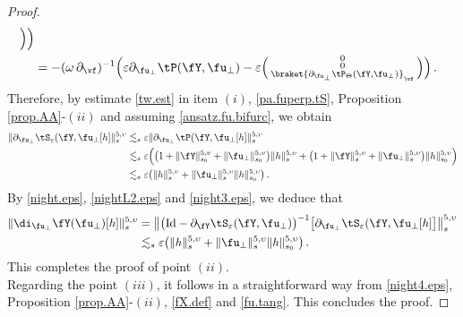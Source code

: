 \documentclass[a4paper,reqno,10pt]{article}
\newcommand{\pa}{\partial}
\begin{document}
\begin{proof}
\begin{align}
\begin{smallmatrix}
   	\end{smallmatrix}\Big) \Big) \\
   	&  =  - (\omega\,\pa_{\vf})^{-1} \Big( \varepsilon \pa_{\fu_{\perp}}\tP(\fY,\fu_{\perp}) -\varepsilon \Big(\begin{smallmatrix}
   		0  \\ 0 \\ \braket{ \pa_{\fu_{\perp}} \tP_{\Theta}(\fY,\fu_{\perp}) }_{\vf}
   	\end{smallmatrix}\Big) \Big)  \,. \label{pa.fuperp.tS}
   \end{align}
   Therefore, by estimate \eqref{tw.est} in item $(i)$, \eqref{pa.fuperp.tS}, Proposition \ref{prop.AA}-$(ii)$ and assuming \eqref{ansatz.fu.bifurc}, we obtain 
   \begin{align}
   	\|  	\pa_{\fu_{\perp}} \tS_{\varepsilon}(\fY,\fu_{\perp}[h]\|_{s}^{5,\upsilon} & \lesssim_{s} \varepsilon \| 	\pa_{\fu_{\perp}} \tP(\fY,\fu_{\perp}[h] \|_{s}^{5,\upsilon} \\
   	& \lesssim_{s} \varepsilon \Big( \big( 1+\| \fY\|_{s_0}^{5,\upsilon} + \| \fu_{\perp}\|_{s_0}^{5,\upsilon} \big) \| h \|_{s}^{5,\upsilon}+  \big( 1+ \| \fY\|_{s}^{5,\upsilon} + \| \fu_{\perp}\|_{s}^{5,\upsilon} \big) \| h \|_{s_0}^{5,\upsilon} \Big) \\
   	& \lesssim_{s}  \varepsilon\big(  \| h\|_{s}^{5,\upsilon}  +  \| \fu_{\perp}\|_{s}^{5,\upsilon}   \| h\|_{s_0}^{5,\upsilon}  \big) \,.\label{night3.eps} 
   \end{align}
   By \eqref{night.eps}, \eqref{nightL2.eps} and \eqref{night3.eps}, we deduce that
   \begin{align}
   	\| \di_{\fu_{\perp}} \fY(\fu_{\perp}) [h] \|_{s}^{5,\upsilon} & = \big\|  \big( {\rm Id} -\pa_{\fY} \tS_{\varepsilon}(\fY,\fu_{\perp})\big)^{-1} \big[  	\pa_{\fu_{\perp}} \tS_{\varepsilon}(\fY,\fu_{\perp}[h] \big] \big\|_{s}^{5,\upsilon} \\
   	& \lesssim_{s}  \varepsilon\big(  \| h\|_{s}^{5,\upsilon}  +  \| \fu_{\perp}\|_{s}^{5,\upsilon}   \| h\|_{s_0}^{5,\upsilon}  \big) \,. \label{night4.eps}
   \end{align}
   This completes the proof of point $(ii)$.\\
Regarding the  point $(iii)$, it follows in a straightforward way  from \eqref{night4.eps}, Proposition \ref{prop.AA}-$(ii)$, \eqref{fX.def} and \eqref{fu.tang}. This concludes the proof.
\end{proof}
\end{document}
